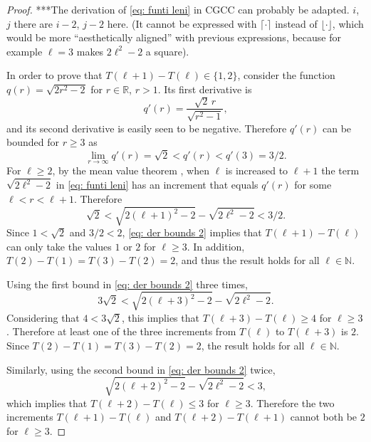 \documentclass[12pt, a4paper]{article}
\newcommand{\funti}{T} %
\newcommand{\len}{\ell} %
\newcommand{\leni}{\ell} %
\newcommand{\genfun}{q}
\newcommand{\genvar}{r}
\begin{document}
\begin{proof}
***The derivation of \eqref{eq: funti leni} in CGCC can probably be adapted. $i$, $j$ there are $i-2$, $j-2$ here. (It cannot be expressed with $\lceil \cdot \rceil$ instead of $\lfloor \cdot \rfloor$, which would be more ``aesthetically aligned'' with previous expressions, because for example $\len=3$ makes $2\len^2-2$ a square).


In order to prove that $\funti(\leni+1)-\funti(\leni) \in \{1,2\}$, consider the function $\genfun(\genvar) = \sqrt{2\genvar^2-2}$ for $\genvar \in \mathbb R$, $\genvar>1$. Its first derivative is
\begin{equation}
\genfun'(\genvar) = \frac {\sqrt{2} \, \genvar} {\sqrt{\genvar^2-1}},
\end{equation}
and its second derivative is easily seen to be negative. Therefore $\genfun'(\genvar)$ can be bounded for $\genvar \geq 3$ as
\begin{equation}
\label{eq: der bounds}
\lim_{\genvar \rightarrow \infty} \genfun'(\genvar) = \sqrt{2} < \genfun'(\genvar) < \genfun'(3) = 3/2.
\end{equation}
For $\leni \geq 2$, by the mean value theorem \cite[section~5.3]{Abbott15}, when $\leni$ is increased to $\leni+1$ the term $\sqrt{2\leni^2-2}$ in \eqref{eq: funti leni} has an increment that equals $\genfun'(\genvar)$ for some $\leni < \genvar < \leni+1$. Therefore
\begin{equation}
\label{eq: der bounds 2}
\sqrt{2} < \sqrt{2(\leni+1)^2-2} - \sqrt{2\leni^2-2} < 3/2.
\end{equation}
Since $1 < \sqrt{2}$ and $3/2 < 2$, \eqref{eq: der bounds 2} implies that $\funti(\leni+1)-\funti(\leni)$ can only take the values $1$ or $2$ for $\leni \geq 3$. In addition, $\funti(2)-\funti(1) = \funti(3)-\funti(2) = 2$, and thus the result holds for all $\leni \in \mathbb N$.

Using the first bound in \eqref{eq: der bounds 2} three times,
\begin{equation}
3\sqrt{2} < \sqrt{2(\leni+3)^2-2} - \sqrt{2\leni^2-2}.
\end{equation}
Considering that $4 < 3\sqrt{2}$, this implies that $\funti(\leni+3)-\funti(\leni) \geq 4$ for $\leni \geq 3$. Therefore at least one of the three increments from $\funti(\leni)$ to $\funti(\leni+3)$ is $2$. Since $\funti(2)-\funti(1) = \funti(3)-\funti(2) = 2$, the result holds for all $\leni \in \mathbb N$.

Similarly, using the second bound in \eqref{eq: der bounds 2} twice,
\begin{equation}
\sqrt{2(\leni+2)^2-2} - \sqrt{2\leni^2-2} < 3,
\end{equation}
which implies that $\funti(\leni+2)-\funti(\leni) \leq 3$ for $\leni \geq 3$. Therefore the two increments $\funti(\leni+1)-\funti(\leni)$ and $\funti(\leni+2)-\funti(\leni+1)$ cannot both be $2$ for $\leni \geq 3$.
\end{proof}
\end{document}
